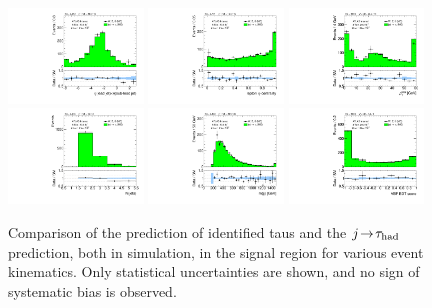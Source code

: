 \begin{figure}[tp]
  \includegraphics[width=0.32\textwidth]{figures/analysis/vbf-MCXSR/jets-etaprod} 
  \includegraphics[width=0.32\textwidth]{figures/analysis/vbf-MCXSR/lep-eta-centrality}
  \includegraphics[width=0.32\textwidth]{figures/analysis/vbf-MCXSR/system-pt} \\
  \includegraphics[width=0.32\textwidth]{figures/analysis/vbf-MCXSR/n-jets30}
  \includegraphics[width=0.32\textwidth]{figures/analysis/vbf-MCXSR/dijet-m-high}
  \includegraphics[width=0.32\textwidth]{figures/analysis/vbf-MCXSR/BDTEve-VBF} \\
  \caption{Comparison of the prediction of identified taus and the $j\!\rightarrow\!\tau_\text{had}$ prediction, both in simulation, in the signal region for various event kinematics. Only statistical uncertainties are shown, and no sign of systematic bias is observed.}
  \label{fig:backgrounds-MCXSR-jets}
\end{figure}


